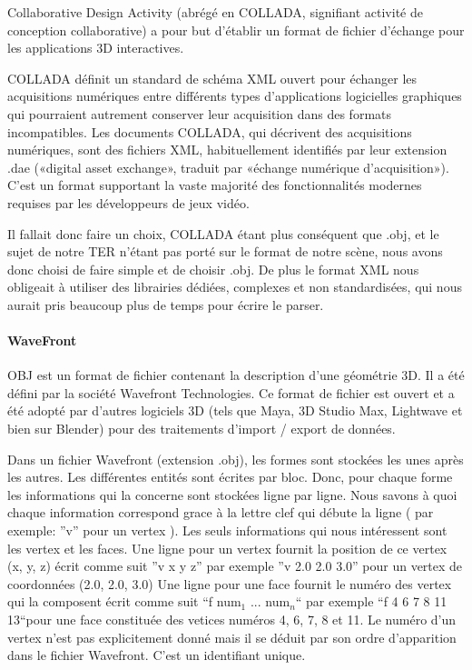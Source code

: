 \documentclass[a4paper,12pt]{report}
\begin{document}
Collaborative Design Activity (abrégé en COLLADA, signifiant activité de conception collaborative) a pour but d'établir un format de fichier d'échange pour les applications 3D interactives.

COLLADA définit un standard de schéma XML ouvert pour échanger les acquisitions numériques entre différents types d'applications logicielles graphiques qui pourraient autrement conserver leur acquisition dans des formats incompatibles. Les documents COLLADA, qui décrivent des acquisitions numériques, sont des fichiers XML, habituellement identifiés par leur extension .dae («digital asset exchange», traduit par «échange numérique d'acquisition»).
C'est un format supportant la vaste majorité des fonctionnalités modernes
requises par les développeurs de jeux vidéo. 

Il fallait donc faire un choix, COLLADA étant plus conséquent que .obj, et le sujet de notre TER n'étant pas porté sur le format de notre scène, 
nous avons donc choisi de faire simple et de choisir .obj. De plus le format XML nous obligeait à utiliser des librairies dédiées, complexes et non standardisées, qui nous aurait pris beaucoup plus de temps pour écrire le parser.

\paragraph{WaveFront}

OBJ est un format de fichier contenant la description d'une géométrie 3D. Il a été défini par la société Wavefront Technologies. Ce format de fichier est ouvert et a été adopté par d'autres logiciels 3D (tels que Maya, 3D Studio Max, Lightwave et bien sur Blender) pour des traitements d'import / export de données.

Dans un fichier Wavefront (extension .obj), les formes sont stockées les unes après les autres. Les différentes entités sont écrites par bloc.
Donc, pour chaque forme les informations qui la concerne sont stockées ligne par ligne. Nous savons à quoi chaque information correspond grace à la lettre clef qui débute la ligne ( par exemple: ''v'' pour un vertex ).
Les seuls informations qui nous intéressent sont les vertex et les faces. 
Une ligne pour un vertex fournit la position de ce vertex (x, y, z) écrit comme suit ''v x y z'' par exemple ''v 2.0 2.0 3.0'' pour un vertex de coordonnées (2.0, 2.0, 3.0)
Une ligne pour une face fournit le numéro des vertex qui la composent écrit comme suit ``f num$_{1}$ ... num$_{n}$`` par exemple ``f 4 6 7 8 11 13``pour une face constituée des vetices numéros 4, 6, 7, 8 et 11. Le numéro d'un vertex n'est pas explicitement donné mais il se déduit par son ordre d'apparition dans le fichier Wavefront. C'est un identifiant unique.
\end{document}
